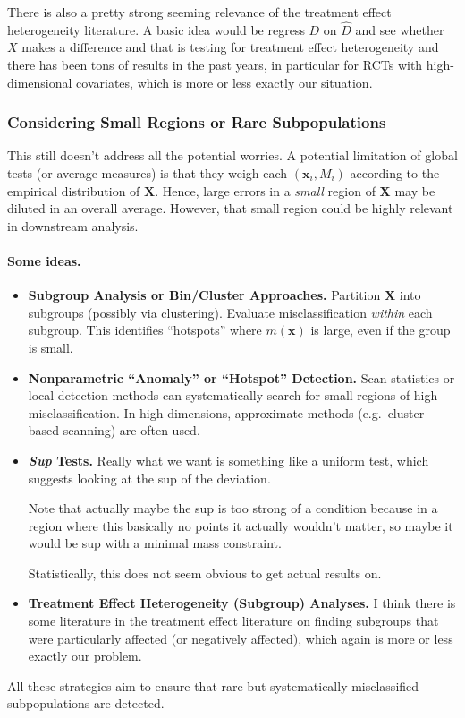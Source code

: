 \documentclass[11pt]{article}
\begin{document}
There is also a pretty strong seeming relevance of the treatment effect heterogeneity literature. A basic idea would be regress $D$ on $\hat{D}$ and see whether $X$ makes a difference and that is testing for treatment effect heterogeneity and there has been tons of results in the past years, in particular for RCTs with high-dimensional covariates, which is more or less exactly our situation.

\subsubsection*{Considering Small Regions or Rare Subpopulations}

This still doesn't address all the potential worries. A potential limitation of global tests (or average measures) is that they weigh each $(\mathbf{x}_i, M_i)$ according to the empirical distribution of $\mathbf{X}$. Hence, large errors in a \emph{small} region of $\mathbf{X}$ may be diluted in an overall average. However, that small region could be highly relevant in downstream analysis.

\paragraph{Some ideas.}
\begin{itemize}
  \item \textbf{Subgroup Analysis or Bin/Cluster Approaches.} Partition $\mathbf{X}$ into subgroups (possibly via clustering). Evaluate misclassification \emph{within} each subgroup. This identifies ``hotspots'' where $m(\mathbf{x})$ is large, even if the group is small. 
  \item \textbf{Nonparametric ``Anomaly'' or ``Hotspot'' Detection.} Scan statistics or local detection methods can systematically search for small regions of high misclassification. In high dimensions, approximate methods (e.g.\ cluster-based scanning) are often used.
  \item \textbf{\emph{Sup} Tests.} Really what we want is something like a uniform test, which suggests looking at the sup of the deviation.
  
  Note that actually maybe the sup is too strong of a condition because in a region where this basically no points it actually wouldn't matter, so maybe it would be sup with a minimal mass constraint. 

  Statistically, this does not seem obvious to get actual results on.
  \item \textbf{Treatment Effect Heterogeneity (Subgroup) Analyses.} I think there is some literature in the treatment effect literature on finding subgroups that were particularly affected (or negatively affected), which again is more or less exactly our problem.
\end{itemize}
All these strategies aim to ensure that rare but systematically misclassified subpopulations are detected.
\end{document}
